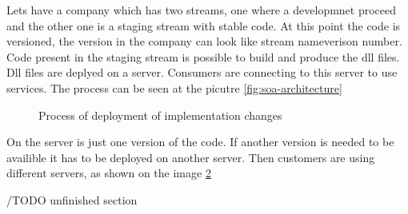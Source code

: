 Lets have a company which has two streams, one where a developmnet proceed and the other one is a staging stream with stable code. At this point the code is versioned, the version in the company can look like {stream name}{verison number}. Code present in the staging stream is possible to build and produce the dll files. Dll files are deplyed on a server. Consumers are connecting to this server to use services. The process can be seen at the picutre \ref{fig:soa-architecture}

\begin{figure}[htp] 
\caption{Process of deployment of implementation changes}
\label{fig:service-implementation}
\end{figure} 

\bigskip

On the server is just one version of the code. If another version is needed to be availible it has to be deployed on another server. Then customers are using different servers, as shown on the image \ref{fig:consumer-server}

/TODO unfinished section

\begin{figure}[htp] 
\caption{}
\label{fig:consumer-server}
\end{figure} 

